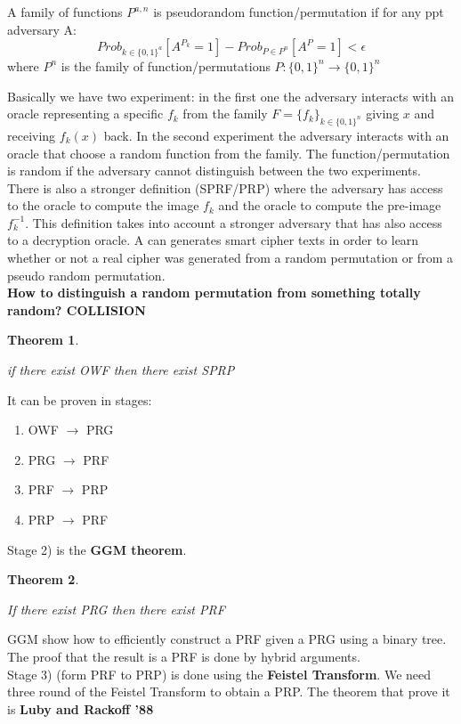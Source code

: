 \documentclass{article}
\newtheorem{thm}{Theorem}[section]
\newenvironment{theorem}{\begin{thm}\begin{rm}}%
{\end{rm}\end{thm}}
\begin{document}
A family of functions $P^{a,n}$ is pseudorandom function/permutation if for any ppt adversary A:
\begin{equation}
Prob_{k \in \{0,1\}^a}[A^{P_k}= 1] - Prob_{P \in P^n}[A^{P}= 1] < \epsilon
\end{equation} 
where $P^n$ is the family of function/permutations $P: \{0,1\}^n \rightarrow \{0,1\}^n$ 

Basically we have two experiment: in the first one the adversary interacts with an oracle representing a specific $f_k$ from the family $F= \{f_k\}_{k \in \{0,1\}^n}$  giving $x$ and receiving $f_k(x)$ back. In the second experiment the adversary interacts with an oracle that choose a random function from the family.
The function/permutation is random if the adversary cannot distinguish between the two experiments.\\

There is also a stronger definition (SPRF/PRP) where the adversary has access to the oracle to compute the image $f_k$ and the oracle to compute the pre-image $f^{-1}_{k}$. This definition takes into account a stronger adversary that has also access to a decryption oracle.  A can generates smart cipher texts in order to learn whether or not a real cipher was generated from a random permutation or from a pseudo random permutation.\\

\textbf{How to distinguish a random permutation from something totally random? COLLISION   }

\begin{theorem}
if there exist OWF then there exist SPRP
\end{theorem}
It can be proven in stages:
\begin{enumerate}
\item OWF $\rightarrow$ PRG 
\item PRG $\rightarrow$ PRF
\item PRF $\rightarrow$ PRP
\item PRP $\rightarrow$ PRF
\end{enumerate}

Stage 2) is the\textbf{ GGM theorem}.
\begin{theorem}
If there exist PRG then there exist PRF
\end{theorem}
GGM show how to efficiently construct a PRF given a PRG using a binary tree. The proof that the result is a PRF is done by hybrid arguments.\\

Stage 3) (form PRF to PRP) is done using the \textbf{Feistel Transform}. We need three round of the Feistel Transform to obtain a PRP. The theorem that prove it is \textbf{Luby and Rackoff '88}



%
%
\end{document}
